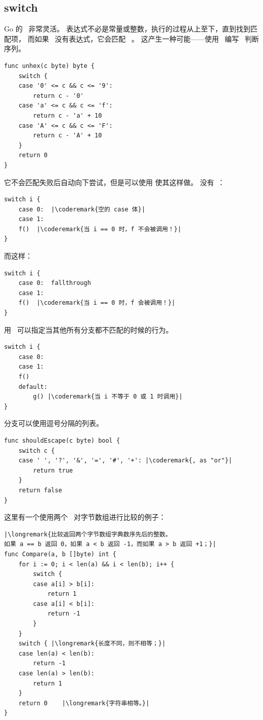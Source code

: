 \subsection{switch}
Go 的~ 非常灵活。
表达式不必是常量或整数，执行的过程从上至下，直到找到匹配项，
而如果~ 没有表达式，它会匹配~ 。
这产生一种可能——使用~ 编写~ 判断序列。
\begin{lstlisting}
func unhex(c byte) byte {
    switch {
    case '0' <= c && c <= '9':
        return c - '0'
    case 'a' <= c && c <= 'f':
        return c - 'a' + 10
    case 'A' <= c && c <= 'F':
        return c - 'A' + 10
    }
    return 0
}
\end{lstlisting}
它不会匹配失败后自动向下尝试，但是可以使用
使其这样做。
没有~：
\begin{lstlisting}
switch i {
    case 0:  |\coderemark{空的 case 体}|
    case 1:
	f()  |\coderemark{当 i == 0 时，f 不会被调用！}|
}
\end{lstlisting}
而这样：
\begin{lstlisting}
switch i {
    case 0:  fallthrough
    case 1:
	f()  |\coderemark{当 i == 0 时，f 会被调用！}|
}
\end{lstlisting}
用~ 可以指定当其他所有分支都不匹配的时候的行为。
\begin{lstlisting}
switch i {
    case 0:  
    case 1:
	f()
    default:	
        g()	|\coderemark{当 i 不等于 0 或 1 时调用}|
}
\end{lstlisting}
分支可以使用逗号分隔的列表。
\begin{lstlisting}
func shouldEscape(c byte) bool {
    switch c {
    case ' ', '?', '&', '=', '#', '+': |\coderemark{, as "or"}|
        return true
    }
    return false
}
\end{lstlisting}
这里有一个使用两个~ 对字节数组进行比较的例子：
\begin{lstlisting}
|\longremark{比较返回两个字节数组字典数序先后的整数。
如果 a == b 返回 0，如果 a < b 返回 -1，而如果 a > b 返回 +1；}|
func Compare(a, b []byte) int {
    for i := 0; i < len(a) && i < len(b); i++ {
        switch {
        case a[i] > b[i]:
            return 1
        case a[i] < b[i]:
            return -1
        }
    }
    switch { |\longremark{长度不同，则不相等；}|
    case len(a) < len(b):
        return -1
    case len(a) > len(b):
        return 1
    }
    return 0	|\longremark{字符串相等。}|
}
\end{lstlisting}
\showremarks

